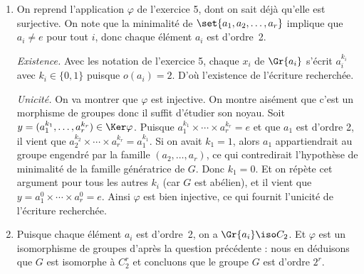 \begin{enumerate}
  \item
    On reprend l'application $\varphi$ de l'exercice 5, dont on sait déjà qu'elle est surjective. On note que la minimalité de $\set{a_1,a_2,\dots,a_r}$ implique que $a_i \neq e$ pour tout $i$, donc chaque élément $a_i$ est d'ordre~2.
    
    \emph{Existence.} 
    Avec les notation de l'exercice 5, chaque $x_i$ de $\Gr{a_i}$ s'écrit $a_i^{k_i}$ avec $k_i \in \{0,1\}$ puisque $o(a_i) = 2$. D'où l'existence de l'écriture recherchée.
    
    \emph{Unicité.} On va montrer que $\varphi$ est injective. On montre aisément que c'est un morphisme de groupes donc il suffit d'étudier son noyau. Soit $y=(a_1^{k_1},\ldots, a_r^{k_r}) \in \Ker \varphi$. Puisque $a_1^{k_1}\times \cdots \times a_r^{k_r} = e$ et que $a_1$ est d'ordre 2, il vient que $a_2^{k_2}\times \cdots \times a_r^{k_r}= a_1^{k_1}$. Si on avait $k_1=1$, alors $a_1$ appartiendrait au groupe engendré par la famille $(a_2, \ldots, a_r)$, ce qui contredirait l'hypothèse de minimalité de la famille génératrice de $G$. Donc $k_1 = 0$. Et on répète cet argument pour tous les autres $k_i$ (car $G$ est abélien), et il vient que $y = a_1^0\times\cdots\times a_r^0 = e$. Ainsi $\varphi$ est bien injective, ce qui fournit l'unicité de l'écriture recherchée.
  
  \item
     Puisque chaque élément $a_i$ est d'ordre~2, on a $\Gr{a_i}\iso C_2$. Et $\varphi$ est un isomorphisme de groupes d'après la question précédente : nous en déduisons que $G$ est isomorphe à $C_2^r$ et concluons que le groupe $G$ est d'ordre $2^r$.
\end{enumerate}
